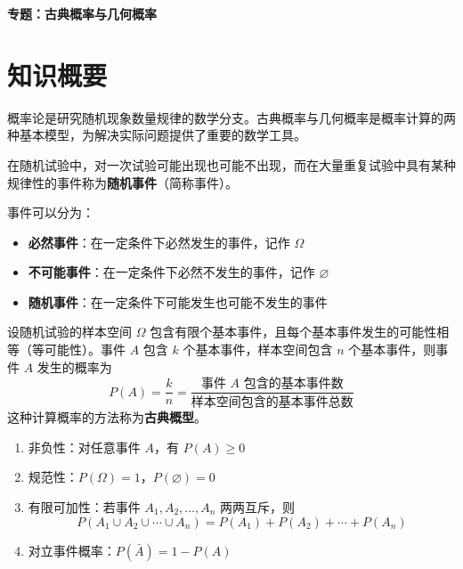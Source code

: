 \documentclass[11pt]{ctexrep}
\begin{document}
\begin{center}
    {\LARGE\bfseries 专题：古典概率与几何概率}
\end{center}

\section*{知识概要}

概率论是研究随机现象数量规律的数学分支。古典概率与几何概率是概率计算的两种基本模型，为解决实际问题提供了重要的数学工具。

\begin{definition}[随机事件]
    在随机试验中，对一次试验可能出现也可能不出现，而在大量重复试验中具有某种规律性的事件称为\textbf{随机事件}（简称事件）。
    
    事件可以分为：
    \begin{itemize}
        \item \textbf{必然事件}：在一定条件下必然发生的事件，记作 $\Omega$
        \item \textbf{不可能事件}：在一定条件下必然不发生的事件，记作 $\varnothing$
        \item \textbf{随机事件}：在一定条件下可能发生也可能不发生的事件
    \end{itemize}
\end{definition}

\begin{definition}[古典概率]
    设随机试验的样本空间 $\Omega$ 包含有限个基本事件，且每个基本事件发生的可能性相等（等可能性）。事件 $A$ 包含 $k$ 个基本事件，样本空间包含 $n$ 个基本事件，则事件 $A$ 发生的概率为
    \[
        P(A) = \frac{k}{n} = \frac{\text{事件 } A \text{ 包含的基本事件数}}{\text{样本空间包含的基本事件总数}}
    \]
    这种计算概率的方法称为\textbf{古典概型}。
\end{definition}

\begin{property}[古典概率的基本性质]
    \begin{enumerate}
        \item 非负性：对任意事件 $A$，有 $P(A) \geq 0$
        \item 规范性：$P(\Omega) = 1$，$P(\varnothing) = 0$
        \item 有限可加性：若事件 $A_1, A_2, \ldots, A_n$ 两两互斥，则
        \[
            P(A_1 \cup A_2 \cup \cdots \cup A_n) = P(A_1) + P(A_2) + \cdots + P(A_n)
        \]
        \item 对立事件概率：$P(\bar{A}) = 1 - P(A)$
    \end{enumerate}
\end{property}
\end{document}

